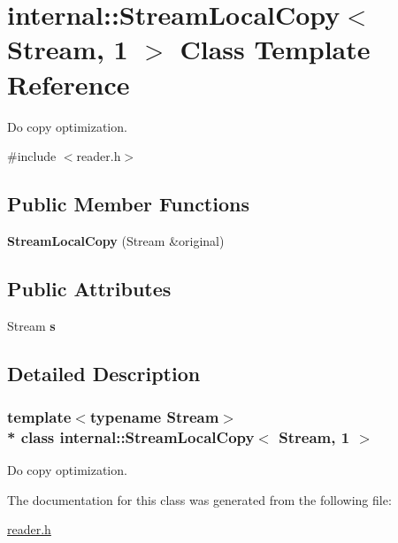 \hypertarget{a00287}{}\section{internal\+:\+:Stream\+Local\+Copy$<$ Stream, 1 $>$ Class Template Reference}
\label{a00287}


Do copy optimization.  




{\ttfamily \#include $<$reader.\+h$>$}

\subsection*{Public Member Functions}
\begin{DoxyCompactItemize}
\item 
{\bfseries Stream\+Local\+Copy} (Stream \&original)\hypertarget{a00287_aba475fed3eecc9f77ff059fdb7fe2a32}{}\label{a00287_aba475fed3eecc9f77ff059fdb7fe2a32}

\end{DoxyCompactItemize}
\subsection*{Public Attributes}
\begin{DoxyCompactItemize}
\item 
Stream {\bfseries s}\hypertarget{a00287_a1d3e8ae8756325df25715d4ffb9c1b44}{}\label{a00287_a1d3e8ae8756325df25715d4ffb9c1b44}

\end{DoxyCompactItemize}


\subsection{Detailed Description}
\subsubsection*{template$<$typename Stream$>$\\*
class internal\+::\+Stream\+Local\+Copy$<$ Stream, 1 $>$}

Do copy optimization. 

The documentation for this class was generated from the following file\+:\begin{DoxyCompactItemize}
\item 
\hyperlink{a00683}{reader.\+h}\end{DoxyCompactItemize}

